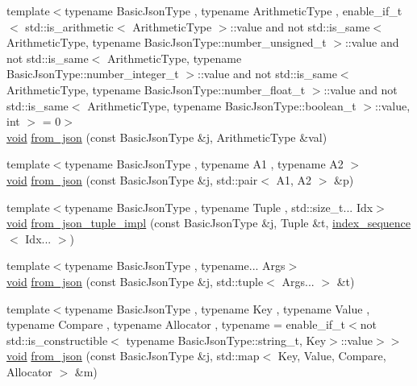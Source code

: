 \begin{DoxyCompactItemize}
{\footnotesize template$<$typename Basic\+Json\+Type , typename Arithmetic\+Type , enable\+\_\+if\+\_\+t$<$ std\+::is\+\_\+arithmetic$<$ Arithmetic\+Type $>$\+::value and not std\+::is\+\_\+same$<$ Arithmetic\+Type, typename Basic\+Json\+Type\+::number\+\_\+unsigned\+\_\+t $>$\+::value and not std\+::is\+\_\+same$<$ Arithmetic\+Type, typename Basic\+Json\+Type\+::number\+\_\+integer\+\_\+t $>$\+::value and not std\+::is\+\_\+same$<$ Arithmetic\+Type, typename Basic\+Json\+Type\+::number\+\_\+float\+\_\+t $>$\+::value and not std\+::is\+\_\+same$<$ Arithmetic\+Type, typename Basic\+Json\+Type\+::boolean\+\_\+t $>$\+::value, int $>$  = 0$>$ }\\\mbox{\hyperlink{namespacenlohmann_1_1detail_a59fca69799f6b9e366710cb9043aa77d}{void}} \mbox{\hyperlink{namespacenlohmann_1_1detail_a839b0ab50d2c9bce669068f56bc41202}{from\+\_\+json}} (const Basic\+Json\+Type \&j, Arithmetic\+Type \&val)
\item 
{\footnotesize template$<$typename Basic\+Json\+Type , typename A1 , typename A2 $>$ }\\\mbox{\hyperlink{namespacenlohmann_1_1detail_a59fca69799f6b9e366710cb9043aa77d}{void}} \mbox{\hyperlink{namespacenlohmann_1_1detail_aae9f9c2601074e323d49428132cc293d}{from\+\_\+json}} (const Basic\+Json\+Type \&j, std\+::pair$<$ A1, A2 $>$ \&p)
\item 
{\footnotesize template$<$typename Basic\+Json\+Type , typename Tuple , std\+::size\+\_\+t... Idx$>$ }\\\mbox{\hyperlink{namespacenlohmann_1_1detail_a59fca69799f6b9e366710cb9043aa77d}{void}} \mbox{\hyperlink{namespacenlohmann_1_1detail_a28253915d9db4a0112d60eaee0422949}{from\+\_\+json\+\_\+tuple\+\_\+impl}} (const Basic\+Json\+Type \&j, Tuple \&t, \mbox{\hyperlink{structnlohmann_1_1detail_1_1index__sequence}{index\+\_\+sequence}}$<$ Idx... $>$)
\item 
{\footnotesize template$<$typename Basic\+Json\+Type , typename... Args$>$ }\\\mbox{\hyperlink{namespacenlohmann_1_1detail_a59fca69799f6b9e366710cb9043aa77d}{void}} \mbox{\hyperlink{namespacenlohmann_1_1detail_a8b99ec9b29f3f20a18fc4281fb784e49}{from\+\_\+json}} (const Basic\+Json\+Type \&j, std\+::tuple$<$ Args... $>$ \&t)
\item 
{\footnotesize template$<$typename Basic\+Json\+Type , typename Key , typename Value , typename Compare , typename Allocator , typename  = enable\+\_\+if\+\_\+t$<$not std\+::is\+\_\+constructible$<$                                     typename Basic\+Json\+Type\+::string\+\_\+t, Key$>$\+::value$>$$>$ }\\\mbox{\hyperlink{namespacenlohmann_1_1detail_a59fca69799f6b9e366710cb9043aa77d}{void}} \mbox{\hyperlink{namespacenlohmann_1_1detail_ae93147a54d2740228ef16a5e6210ca3e}{from\+\_\+json}} (const Basic\+Json\+Type \&j, std\+::map$<$ Key, Value, Compare, Allocator $>$ \&m)

\end{DoxyCompactItemize}
